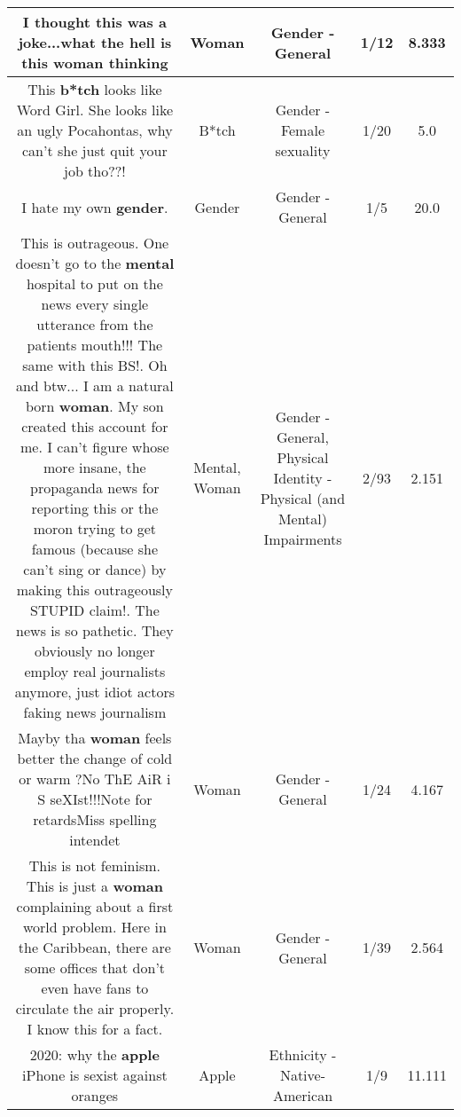 \documentclass[11pt]{article}
\newlength\mylength
\begin{document}
\begin{center}
\begin{longtable}{|C{.65\mylength}|C{.30\mylength}|C{.12\mylength}|C{.12\mylength}|C{.12\mylength}|}
  \small I thought this was a joke...what the hell is this \textbf{woman} thinking\normalsize   & Woman & Gender - General & 1/12 & 8.333 \\  \hline
  \small This \textbf{b*tch} looks like Word Girl. She looks like an ugly Pocahontas, why can't she just quit your job tho??!\normalsize   & B*tch & Gender - Female sexuality & 1/20 & 5.0 \\  \hline
  \small I hate my own \textbf{gender}.\normalsize   & Gender & Gender - General & 1/5 & 20.0 \\  \hline
  \small This is outrageous.  One doesn't go to the \textbf{mental} hospital to put on the news every single utterance from the patients mouth!!!  The same with this BS!.  Oh and btw...  I am  a natural born \textbf{woman}.   My son created this account for me.  I can't figure whose more insane,  the propaganda news for reporting  this or the moron trying to get famous (because she can't sing or dance) by making this outrageously STUPID claim!. The news is so pathetic.  They obviously no longer employ real journalists anymore,  just idiot actors faking news journalism\normalsize   & Mental, Woman & Gender - General, Physical Identity - Physical (and Mental) Impairments & 2/93 & 2.151 \\  \hline
  \small Mayby tha \textbf{woman} feels better the change of cold or warm ?No ThE AiR i S seXIst!!!Note for retardsMiss spelling intendet\normalsize   & Woman & Gender - General & 1/24 & 4.167 \\  \hline
  \small This is not feminism. This is just a \textbf{woman} complaining about a first world problem. Here in the Caribbean, there are some offices that don't even have fans to circulate the air properly. I know this for a fact.\normalsize   & Woman & Gender - General & 1/39 & 2.564 \\  \hline
  \small 2020: why the \textbf{apple} iPhone is sexist against oranges\normalsize   & Apple & Ethnicity - Native-American & 1/9 & 11.111 \\  \hline

\end{longtable}
\end{center}
\end{document}
